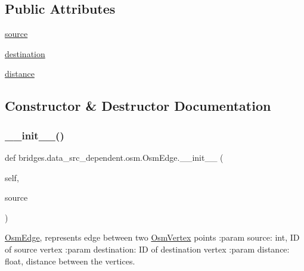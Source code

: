 \subsection*{Public Attributes}
\begin{DoxyCompactItemize}
\item 
\mbox{\hyperlink{classbridges_1_1data__src__dependent_1_1osm_1_1_osm_edge_a968664892933e9784909282cc53b0315}{source}}
\item 
\mbox{\hyperlink{classbridges_1_1data__src__dependent_1_1osm_1_1_osm_edge_aa81426d41bd031b2fa3789173206c0dc}{destination}}
\item 
\mbox{\hyperlink{classbridges_1_1data__src__dependent_1_1osm_1_1_osm_edge_aed843c7fcb887bb11b609387fc3af35f}{distance}}
\end{DoxyCompactItemize}


\subsection{Constructor \& Destructor Documentation}
\mbox{\label{classbridges_1_1data__src__dependent_1_1osm_1_1_osm_edge_ac0f57be58220744c49bffc353d73db6f}} 
\subsubsection{\texorpdfstring{\+\_\+\+\_\+init\+\_\+\+\_\+()}{\_\_init\_\_()}}
{\footnotesize\ttfamily def bridges.\+data\+\_\+src\+\_\+dependent.\+osm.\+Osm\+Edge.\+\_\+\+\_\+init\+\_\+\+\_\+ (\begin{DoxyParamCaption}\item[{}]{self,  }\item[{}]{source }\end{DoxyParamCaption})}



\mbox{\hyperlink{classbridges_1_1data__src__dependent_1_1osm_1_1_osm_edge}{Osm\+Edge}}, represents edge between two \mbox{\hyperlink{classbridges_1_1data__src__dependent_1_1osm_1_1_osm_vertex}{Osm\+Vertex}} points \+:param source\+: int, ID of source vertex \+:param destination\+: ID of destination vertex \+:param distance\+: float, distance between the vertices. 



